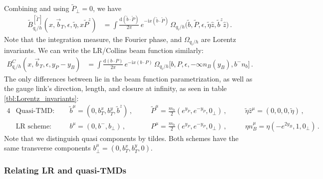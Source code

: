 \documentclass[11pt,a4paper]{article}
\newcommand{\df}{\mathrm{d}}
\newcommand{\img}{\mathrm{i}}
\newcommand{\eps}{\epsilon}
\newcommand{\nn}{\nonumber}
\newcommand{\bt}{\vec b_T}
\newcommand{\Corr}{\Omega}
\newcommand{\q}{q_i}
\begin{document}
Combining  and using $\tilde P_\perp = 0$, we have
\begin{align} \label{eq:qbeam_3}
	\tilde B_{\q/h}^{[\tilde\Gamma]}(x, \bt, \eps, \tilde\eta, x \tilde P^z) &
	= \int\frac{\df (\tilde b \cdot \tilde P)}{2\pi} \, e^{-\img x (\tilde b \cdot \tilde P)} \,
	\Corr_{\q/h}\bigl(\tilde b, \tilde P, \eps,  \tilde \eta \hat z, \tilde b^z \hat{z} \bigr)
	\,.\end{align}
Note that the integration measure, the Fourier phase, and $\Corr_{\q/h}$ are  Lorentz invariants.
We can write the LR/Collins beam function similarly:
\begin{align} \label{eq:def_Collins_2}
	B_{\q/h}^C(x, \bt, \eps, y_P - y_B) &
	= \int\frac{\df (b \cdot P)}{2\pi} \, e^{-\img x (b \cdot P)} \,
	\Corr_{\q/h}\bigl[b, P, \eps,  -\infty n_B(y_B), b^- n_b \bigr]
	\,.\end{align}
The only differences between  lie in the beam function parametrization, as well as the gauge link's direction, length, and closure at infinity, as seen in table \ref{tbl:Lorentz_invariants}:
\begin{alignat}{4} \label{eq:param_choices}
 &\text{Quasi-TMD:}
   \quad &&  \tilde  b^\mu = (0, b_T^x, b_T^y, \tilde b^z)
   \,,\quad &&\tilde P^\mu = \frac{m_h}{2} (e^{ y_{\tilde P}}, e^{- y_{\tilde P}}, 0_\perp)
   \,,\quad && \tilde\eta \hat z^\mu = (0, 0, 0, \tilde\eta)
\,,\\\nn
 &\text{LR~scheme:}
   \quad &&    b^\mu = (0, b^-, b_\perp)
   \,,\quad && P^\mu = \frac{m_h}{2} (e^{y_P}, e^{-y_P}, 0_\perp)
   \,,\quad && \eta n_B^\mu = \eta (-e^{2 y_B}, 1, 0_\perp)
\,.\end{alignat}
Note that we distinguish quasi components by tildes.
Both schemes have the same transverse components $b_\perp^\mu = (0, b_T^x, b_T^y, 0)$.

\subsubsection{Relating LR and quasi-TMDs}\label{sec:boost}
\end{document}

